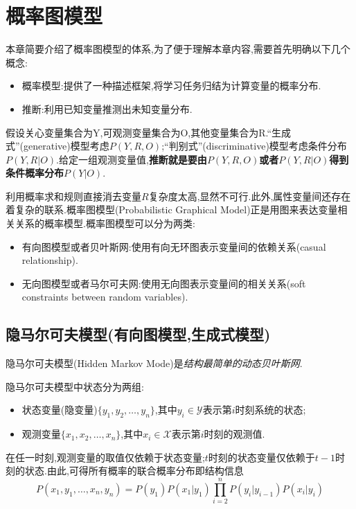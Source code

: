 \chapter{概率图模型}

本章简要介绍了概率图模型的体系,为了便于理解本章内容,需要首先明确以下几个概念:
\begin{itemize}
\item 概率模型:提供了一种描述框架,将学习任务归结为计算变量的概率分布.
\item 推断:利用已知变量推测出未知变量分布.
\end{itemize}

假设关心变量集合为Y,可观测变量集合为O,其他变量集合为R.``生成式''(generative)模型考虑$P(Y,R,O)$;``判别式''(discriminative)模型考虑条件分布$P(Y,R|O)$.给定一组观测变量值,\textbf{推断就是要由$P(Y,R,O)$或者$P(Y,R|O)$得到条件概率分布$P(Y|O)$}.

利用概率求和规则直接消去变量$R$复杂度太高,显然不可行.此外,属性变量间还存在着复杂的联系.概率图模型(Probabilistic Graphical Model)正是用图来表达变量相关关系的概率模型.概率图模型可以分为两类:
\begin{itemize}
\item 有向图模型或者贝叶斯网:使用有向无环图表示变量间的依赖关系(casual relationship).
\item 无向图模型或者马尔可夫网:使用无向图表示变量间的相关关系(soft constraints between random variables).
\end{itemize}

\section{隐马尔可夫模型(有向图模型,生成式模型)}

隐马尔可夫模型(Hidden Markov Mode)是\textit{结构最简单的动态贝叶斯网}.

隐马尔可夫模型中状态分为两组:
\begin{itemize}
\item 状态变量(隐变量)$\{y_1,y_2,\dots,y_n\}$,其中$y_i\in\mathcal Y$表示第$i$时刻系统的状态;
\item 观测变量$\{x_1,x_2,\dots,x_n\}$,其中$x_i\in\mathcal X$表示第$i$时刻的观测值.
\end{itemize}

在任一时刻,观测变量的取值仅依赖于状态变量;$t$时刻的状态变量仅依赖于$t-1$时刻的状态.由此,可得所有概率的联合概率分布即结构信息
\begin{equation}
P(x_1,y_1,\dots,x_n,y_n)=P(y_1)P(x_1|y_1)\prod_{i=2}^nP(y_i|y_{i-1})P(x_i|y_i)
\end{equation}

